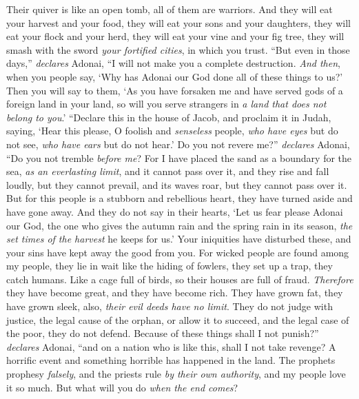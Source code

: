 \begin{biblechapter}
\verse Their quiver is like an open tomb, 
all of them are warriors.
\verse And they will eat your harvest and your food, 
they will eat your sons and your daughters, 
they will eat your flock and your herd, 
they will eat your vine and your fig tree, 
they will smash with the sword \textit{your fortified cities}, 
in which you trust.
\verse “But even in those days,” \textit{declares} Adonai, “I will not make you a complete destruction.
\verse \textit{And then}, when you people say, ‘Why has Adonai our God done all of these things to us?’ Then you will say to them, ‘As you have forsaken me and have served gods of a foreign land in your land, so will you serve strangers in \textit{a land that does not belong to you}.’
\verse “Declare this in the house of Jacob, 
and proclaim it in Judah, saying,
\verse ‘Hear this please, O foolish and \textit{senseless} people, 
\textit{who have eyes} but do not see, 
\textit{who have ears} but do not hear.’
\verse Do you not revere me?” \textit{declares} Adonai, 
“Do you not tremble \textit{before me}? 
For I have placed the sand as a boundary for the sea, 
\textit{as an everlasting limit}, and it cannot pass over it, 
and they rise and fall loudly, but they cannot prevail, 
and its waves roar, but they cannot pass over it.
\verse But for this people is a stubborn and rebellious heart, 
they have turned aside and have gone away.
\verse And they do not say in their hearts, 
‘Let us fear please Adonai our God, 
the one who gives the autumn rain and the spring rain in its season, 
\textit{the set times of the harvest} he keeps for us.’
\verse Your iniquities have disturbed these, 
and your sins have kept away the good from you.
\verse For wicked people are found among my people, 
they lie in wait like the hiding of fowlers, 
they set up a trap, 
they catch humans.
\verse Like a cage full of birds, 
so their houses are full of fraud. 
\textit{Therefore} they have become great, 
and they have become rich.
\verse They have grown fat, 
they have grown sleek, 
also, \textit{their evil deeds have no limit}. 
They do not judge with justice, 
the legal cause of the orphan, 
or allow it to succeed, 
and the legal case of the poor, 
they do not defend.
\verse Because of these things shall I not punish?” \textit{declares} Adonai, 
“and on a nation who is like this, shall I not take revenge?
\verse A horrific event and something horrible has happened in the land.
\verse The prophets prophesy \textit{falsely}, 
and the priests rule \textit{by their own authority}, 
and my people love it so much. 
But what will you do \textit{when the end comes}?
\end{biblechapter}

